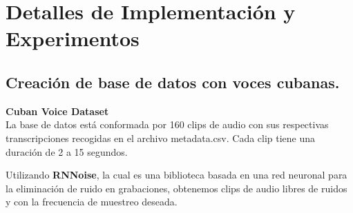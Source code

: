 \chapter{Detalles de Implementación y Experimentos}\label{chapter:implementation}


\section{Creación de base de datos con voces cubanas.}

\textbf{Cuban Voice Dataset}\\
La base de datos está conformada por 160 clips de audio con sus respectivas transcripciones recogidas en el archivo metadata.csv. Cada clip tiene una duración de 2 a 15 segundos. 

Utilizando \textbf{RNNoise}, la cual es una biblioteca basada en una red neuronal para la eliminación de ruido en grabaciones, obtenemos clips de audio libres de ruidos y con la frecuencia de muestreo deseada.










 